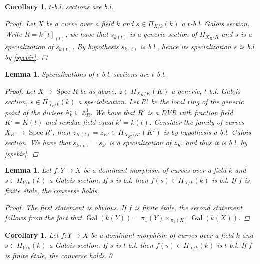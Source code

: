 \documentclass[11pt]{amsart}
\theoremstyle{plain}
\newtheorem{lemma}[theorem]{Lemma}
\newtheorem{corollary}[theorem]{Corollary}
\theoremstyle{definition}
\newcommand{\on}{\operatorname}
\newcommand{\1}{\mathbb{1}}
\newcommand{\A}{\mathbb{A}}
\newcommand{\gal}{\on{Gal}}
\newcommand{\s}{\subseteq}
\newcommand{\spec}{\on{Spec}}
\begin{document}
\begin{corollary}\label{tbb}
	 $t$-b.l. sections are b.l. 
	 \begin{proof}
		Let $X$ be a curve over a field $k$ and $s\in\Pi_{X/k}(k)$ a $t$-b.l. Galois section. Write $R=k[t]_{(t)}$, we have that $s_{k(t)}$ is a generic section of $\Pi_{X_{R}/R}$ and $s$ is a specialization of $s_{k(t)}$. By hypothesis $s_{k(t)}$ is b.l., hence its specialization $s$ is b.l. by \autoref{spebir}. 
	 \end{proof}
\end{corollary}

\begin{lemma}\label{spetbir}
	Specializations of $t$-b.l. sections are $t$-b.l.
	\begin{proof}
		Let $X\to \spec R$ be as above, $z\in\Pi_{X_{K}/K}(K)$ a generic, $t$-b.l. Galois section, $s\in\Pi_{X_{k}/k}(k)$ a specialization. Let $R'$ be the local ring of the generic point of the divisor $\A^{1}_{k}\s\A^{1}_{R}$. We have that $R'$ is a DVR with fraction field $K'=K(t)$ and residue field equal $k'=k(t)$. Consider the family of curves $X_{R'}\to \spec R'$, then $z_{K(t)}=z_{K'}\in \Pi_{X_{K'}/K'}(K')$ is by hypothesis a b.l. Galois section. We have that $s_{k(t)}=s_{k'}$ is a specialization of $z_{K'}$ and thus it is b.l. by \autoref{spebir}.
	\end{proof}
\end{lemma}


\begin{lemma}\label{morb}
	Let $f:Y\to X$ be a dominant morphism of curves over a field $k$ and $s\in\Pi_{Y/k}(k)$ a Galois section. If $s$ is b.l. then $f(s)\in\Pi_{X/k}(k)$ is b.l. If $f$ is finite étale, the converse holds.
	\begin{proof}
		The first statement is obvious. If $f$ is finite étale, the second statement follows from the fact that $\gal(k(Y))=\pi_{1}(Y)\times_{\pi_{1}(X)}\gal(k(X))$.
	\end{proof}
\end{lemma}

\begin{corollary}\label{mortb}
	Let $f:Y\to X$ be a dominant morphism of curves over a field $k$ and $s\in\Pi_{Y/k}(k)$ a Galois section. If $s$ is $t$-b.l. then $f(s)\in\Pi_{X/k}(k)$ is $t$-b.l. If $f$ is finite étale, the converse holds.\qed
\end{corollary}
\end{document}
